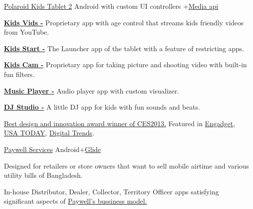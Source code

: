\begin{projectentries}
    \projectentry 
    {\href{https://www.polaroid.com/kids-tablet-2}{Polaroid Kids Tablet 2}} 
    {Android with custom UI controllers
    +{\href{https://developer.android.com/guide/topics/media/}{Media api}}}
    {
      \begin{projectitems} %
        \item {\href{https://youtu.be/7bRafa1btPA?t=94}{\textbf{Kids Vids -}} 
        Proprietary app with age control that streams kids friendly videos from YouTube.}
        \item {\href{https://youtu.be/7bRafa1btPA?t=7}{\textbf{Kids Start -}} 
        The Launcher app of the tablet with a feature of restricting apps.}
        \item {\href{https://youtu.be/7bRafa1btPA?t=120}{\textbf{Kids Cam -}} 
        Proprietary app for taking picture and shooting video with built-in fun filters.}
        \item {\href{https://youtu.be/7bRafa1btPA?t=146}{\textbf{Music Player -}} 
        Audio player app with custom visualizer.}
        \item {\href{https://youtu.be/7bRafa1btPA?t=146}{\textbf{DJ Studio -}} 
        A little DJ app for kids with fun sounds and beats.}
        \item {\href{https://www.androidauthority.com/polaroid-kids-tablet-149-99-144498/}{Best design and innovation award winner of CES2013.}
        Featured in
        {\href{https://www.engadget.com/2013/11/06/polaroid-kids-tablet-2/}{Engadget}, }
        {\href{https://www.usatoday.com/story/dispatches/2013/12/17/family-travel-gifts/4038309/}{USA TODAY}, }
        {\href{https://www.youtube.com/watch?v=WqLu0ru4xO8}{Digital Trends}.}
        }
      \end{projectitems}
    }

    \projectentry 
    {\href{https://play.google.com/store/apps/details?id=com.cloudwell.paywell.services}{Paywell Services}} 
    {Android+{\href{https://github.com/bumptech/glide}{Glide}}}
    {
      \begin{projectitems} %
        \item {Designed for retailers or store owners that want to sell mobile airtime and various utility bills of Bangladesh.}
        \item {In-house Distributor, Dealer, Collector, Territory Officer 
        apps satisfying significant aspects of 
        {\href{https://futurestartup.com/2018/03/13/the-evolution-of-cloudwell-clouldwells-strategy-and-ambition-an-interview-with-anisul-islam-founder-and-ceo-cloudwell/}
        {Paywell's bussiness model.}}}
      \end{projectitems}
    }


\end{projectentries}
